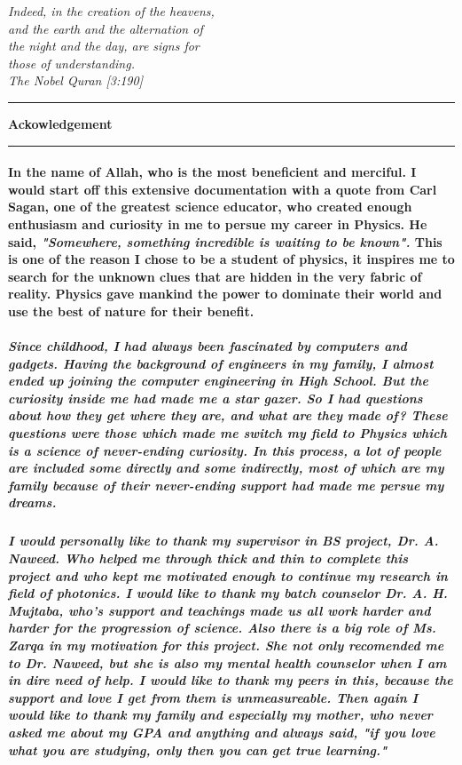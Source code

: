 \documentclass[12pt,twoside]{report}
\begin{document}

\newpage
\pagestyle{empty}
\begin{flushright}
\textit{\small{Indeed, in the creation of the heavens,\\ and the earth and the alternation of\\ the night and the day, are signs for\\ those of understanding.\\ The Nobel Quran [3:190]}}
\end{flushright}
\noindent\rule{15cm}{1pt}
\begin{flushleft}
\textbf{\Large{Ackowledgement}}
\end{flushleft}
\noindent\rule{15cm}{1pt} 
\paragraph{ \normalfont In the name of Allah, who is the most beneficient and merciful. I would start off this extensive documentation with a quote from Carl Sagan, one of the greatest science educator, who created enough enthusiasm and curiosity in me to persue my career in Physics. He said, \textit{"Somewhere, something incredible is waiting to be known".} This is one of the reason I chose to be a student of physics, it inspires me to search for the unknown clues that are hidden in the very fabric of reality. Physics gave mankind the power to dominate their world and use the best of nature for their benefit.}
\subparagraph{ \normalfont Since childhood, I had always been fascinated by computers and gadgets. Having the background of engineers in my family, I almost ended up joining the computer engineering in High School. But the curiosity inside me had made me a star gazer. So I had questions about how they get where they are, and what are they made of? These questions were those which made me switch my field to Physics which is a science of never-ending curiosity. In this process, a lot of people are included some directly and some indirectly, most of which are my family because of their never-ending support had made me persue my dreams.}
\subparagraph{ \normalfont I would personally like to thank my supervisor in BS project, Dr. A. Naweed. Who helped me through thick and thin to complete this project and who kept me motivated enough to continue my research in field of photonics. I would like to thank my batch counselor Dr. A. H. Mujtaba, who's support and teachings made us all work harder and harder for the progression of science. Also there is a big role of Ms. Zarqa in my motivation for this project. She not only recomended me to Dr. Naweed, but she is also my mental health counselor when I am in dire need of help. I would like to thank my peers in this, because the support and love I get from them is unmeasureable. Then again I would like to thank my family and especially my mother, who never asked me about my GPA and anything and always said, "if you love what you are studying, only then you can get true learning."}
\end{document}
